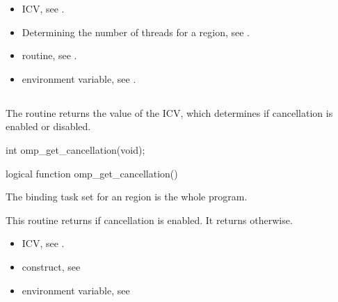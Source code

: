 \crossreferences
\begin{itemize}
\item {} ICV, see 
.

\item Determining the number of threads for a  region, see
. 

\item {} routine, see 
.

\item {} environment variable, see 
.
\end{itemize}









\subsection{}
\label{subsec:omp_get_cancellation}
\summary
The  routine returns the value of the  ICV, which determines if cancellation is enabled or disabled.

\format
\ccppspecificstart
\begin{boxedcode}
int omp\_get\_cancellation(void);
\end{boxedcode}
\ccppspecificend

\fortranspecificstart
\begin{boxedcode}
logical function omp\_get\_cancellation()
\end{boxedcode}
\fortranspecificend

\binding
The binding task set for an  region is the whole program.

\effect
This routine returns  if cancellation is enabled. It returns  otherwise.

\crossreferences
\begin{itemize}
\item {} ICV, see 
.

\item {} construct, see 

\item {} environment variable, see 
\end{itemize}









